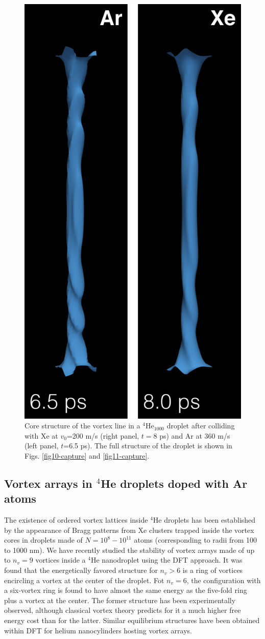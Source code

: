 \begin{figure}[h]
\centerline{\includegraphics[width=0.60\linewidth,clip]{fig12}}
\caption{\label{fig12-capture} 
Core structure of the vortex line in a $^4$He$_{1000}$ droplet after colliding  with  Xe at $v_0$=200 m/s (right panel, $t= 8$ ps) and Ar at 360 m/s (left panel, $t$=6.5 ps). 
The  full structure of the droplet is shown in Figs. \ref{fig10-capture} and \ref{fig11-capture}.
}
\end{figure}
  
\subsection{Vortex arrays in $^4$He droplets doped with Ar atoms}

The existence of ordered vortex lattices inside $^4$He droplets has been established  by the appearance of Bragg patterns from 
Xe clusters trapped inside the vortex cores  in droplets made of $N= 10^8 - 10^{11}$ atoms
(corresponding to radii from 100 to 1000 nm).\citep{Gom14,Jon16}  We have 
recently studied the stability of vortex 
arrays made of up to $n_v=9$ vortices
inside a $^4$He nanodroplet using the DFT approach.\citep{Anc15}  
It was found that 
the energetically favored structure for $n_v > 6$ is a ring 
of vortices encircling a vortex at the center of the droplet.
Fot $n_v=6$,  the 
configuration with a six-vortex ring is found to have almost 
the same energy as the five-fold ring
plus a vortex at the center. The former structure 
has been experimentally observed,\citep{Gom14,Jon16,Ber17} 
although classical vortex theory 
predicts for it a much higher free energy cost than for the latter.\citep{Cam79}
Similar equilibrium structures have been obtained within DFT for
helium nanocylinders hosting vortex arrays.\citep{Anc14}

